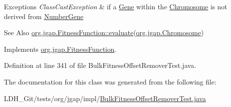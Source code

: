 \begin{DoxyExceptions}{Exceptions}
{\em Class\-Cast\-Exception} & if a \hyperlink{interfaceorg_1_1jgap_1_1_gene}{Gene} within the \hyperlink{classorg_1_1jgap_1_1_chromosome}{Chromosome} is not derived from \hyperlink{classorg_1_1jgap_1_1impl_1_1_number_gene}{Number\-Gene}\\
\hline
\end{DoxyExceptions}
\begin{DoxySeeAlso}{See Also}
\hyperlink{classorg_1_1jgap_1_1_fitness_function_a0078e42480eac93729f906ac4dc185d9}{org.\-jgap.\-Fitness\-Function\-::evaluate}(\hyperlink{classorg_1_1jgap_1_1_chromosome}{org.\-jgap.\-Chromosome}) 
\end{DoxySeeAlso}


Implements \hyperlink{classorg_1_1jgap_1_1_fitness_function_a0078e42480eac93729f906ac4dc185d9}{org.\-jgap.\-Fitness\-Function}.



Definition at line 341 of file Bulk\-Fitness\-Offset\-Remover\-Test.\-java.



The documentation for this class was generated from the following file\-:\begin{DoxyCompactItemize}
\item 
L\-D\-H\-\_\-\-Git/tests/org/jgap/impl/\hyperlink{_bulk_fitness_offset_remover_test_8java}{Bulk\-Fitness\-Offset\-Remover\-Test.\-java}\end{DoxyCompactItemize}
